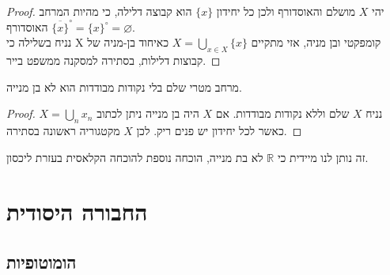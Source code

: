 \documentclass{tstextbook}
\begin{document}
\begin{proof}
יהי \(X\) מושלם והאוסדורף ולכן כל יחידון \(\{x\}\) הוא קבוצה דלילה, כי מהיות המרחב האוסדורף \(\overline{\{x\}}^{\circ}=\{x\}^{\circ}=\varnothing\).\\

נניח בשלילה כי X קומפקטי ובן מניה, אזי מתקיים \(X=\bigcup_{x\in X}\{x\}\) כאיחוד בן-מניה של קבוצות דלילות, בסתירה למסקנה ממשפט בייר.  

\end{proof}
\begin{corollary}
מרחב מטרי שלם בלי נקודות מבודדות הוא לא בן מנייה.

\end{corollary}
\begin{proof}
נניח \(X\) שלם וללא נקודות מבודדות. אם \(X\) היה בן מנייה ניתן לכתוב \(X=\bigcup_{n}x_{n}\) כאשר לכל יחידון יש פנים ריק. לכן \(X\) מקטגוריה ראשונה בסתירה.

\end{proof}
\begin{remark}
זה נותן לנו מיידית כי \(\mathbb{R}\) לא בת מנייה, הוכחה נוספת להוכחה הקלאסית בעזרת ליכסון.

\end{remark}
\chapter{החבורה היסודית}

\section{הומוטופיות}
\end{document}
